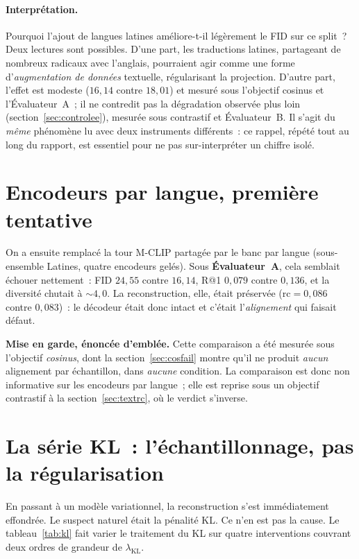 \documentclass[12pt,a4paper,oneside]{report}
\theoremstyle{definition}
\theoremstyle{plain}
\newcommand{\rc}{\mathrm{rc}}
\newcommand{\lkl}{\ensuremath{\lambda_{\mathrm{KL}}}}
\begin{document}
\paragraph{Interprétation.} Pourquoi l'ajout de langues latines améliore-t-il
légèrement le FID sur ce split~? Deux lectures sont possibles. D'une part, les
traductions latines, partageant de nombreux radicaux avec l'anglais, pourraient
agir comme une forme d'\emph{augmentation de données} textuelle, régularisant la
projection. D'autre part, l'effet est modeste ($16{,}14$ contre $18{,}01$) et mesuré
sous l'objectif cosinus et l'Évaluateur~A~; il ne contredit pas la dégradation
observée plus loin (section~\ref{sec:controlee}), mesurée sous contrastif et
Évaluateur~B. Il s'agit du \emph{même} phénomène lu avec deux instruments
différents~: ce rappel, répété tout au long du rapport, est essentiel pour ne pas
sur-interpréter un chiffre isolé.

\section{Encodeurs par langue, première tentative}
\label{sec:perlang-first}

On a ensuite remplacé la tour M-CLIP partagée par le banc par langue (sous-ensemble
Latines, quatre encodeurs gelés). Sous \textbf{Évaluateur~A}, cela semblait échouer
nettement~: FID $24{,}55$ contre $16{,}14$, R@1 $0{,}079$ contre $0{,}136$, et la
diversité chutait à ${\sim}4{,}0$. La reconstruction, elle, était préservée
($\rc = 0{,}086$ contre $0{,}083$)~: le décodeur était donc intact et c'était
l'\emph{alignement} qui faisait défaut.

\begin{encadre}
\textbf{Mise en garde, énoncée d'emblée.} Cette comparaison a été mesurée sous
l'objectif \emph{cosinus}, dont la section~\ref{sec:cosfail} montre qu'il ne
produit \emph{aucun} alignement par échantillon, dans \emph{aucune} condition. La
comparaison est donc non informative sur les encodeurs par langue~; elle est
reprise sous un objectif contrastif à la section~\ref{sec:textrc}, où le verdict
s'inverse.
\end{encadre}

\section{La série KL~: l'échantillonnage, pas la régularisation}
\label{sec:kl}

En passant à un modèle variationnel, la reconstruction s'est immédiatement
effondrée. Le suspect naturel était la pénalité KL. Ce n'en est pas la cause. Le
tableau~\ref{tab:kl} fait varier le traitement du KL sur quatre interventions
couvrant deux ordres de grandeur de \lkl{}.
\end{document}
